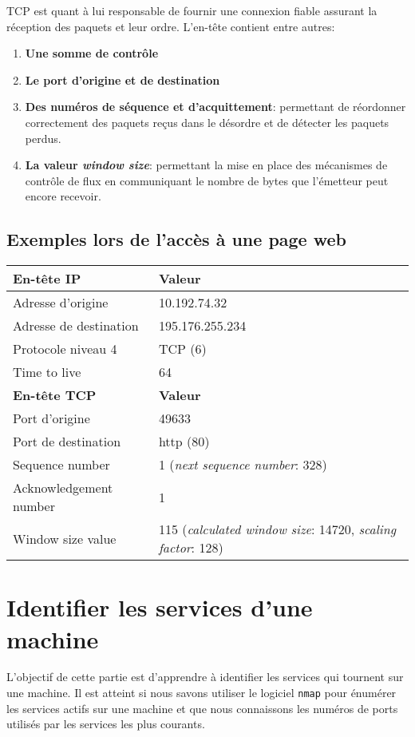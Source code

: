 \documentclass[11pt,a4paper]{article}
\begin{document}
TCP est quant à lui responsable de fournir une connexion fiable assurant la réception des paquets et leur ordre. L'en-tête contient entre autres:

\begin{enumerate}
	\item \textbf{Une somme de contrôle}
	\item \textbf{Le port d'origine et de destination}
	\item \textbf{Des numéros de séquence et d'acquittement}: permettant de réordonner correctement des paquets reçus dans le désordre et de détecter les paquets perdus.
	\item \textbf{La valeur \textit{window size}}: permettant la mise en place des mécanismes de contrôle de flux en communiquant le nombre de bytes que l'émetteur peut encore recevoir.
\end{enumerate}

\subsection{Exemples lors de l'accès à une page web}

\begin{tabular}{|l|p{10cm}|}
	\hline
	\textbf{En-tête IP} & \textbf{Valeur} \\
	\hline
	Adresse d'origine & 10.192.74.32 \\
	Adresse de destination & 195.176.255.234 \\
	Protocole niveau 4 & TCP (6) \\
	Time to live & 64 \\
	\hline
	\hline
	\textbf{En-tête TCP} & \textbf{Valeur} \\
	\hline
	Port d'origine & 49633 \\
	Port de destination & http (80) \\
	Sequence number & 1 (\textit{next sequence number}: 328) \\
	Acknowledgement number & 1 \\
	Window size value & 115 (\textit{calculated window size}: 14720, \textit{scaling factor}: 128) \\
	\hline
\end{tabular}

\section{Identifier les services d'une machine}

L'objectif de cette partie est d'apprendre à identifier les services qui tournent sur une machine. Il est atteint si nous savons utiliser le logiciel \texttt{nmap} pour énumérer les services actifs sur une machine et que nous connaissons les numéros de ports utilisés par les services les plus courants.
\end{document}
